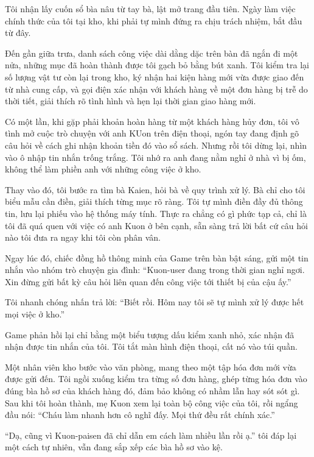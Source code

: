 \documentclass[../main.tex]{subfiles}
\begin{document}
Tôi nhận lấy cuốn sổ bìa nâu từ tay bà, lật mở trang đầu tiên. Ngày làm việc chính thức của tôi tại kho, khi phải tự mình đứng ra chịu trách nhiệm, bắt đầu từ đây.

\ct

Đến gần giữa trưa, danh sách công việc dài dằng dặc trên bàn đã ngắn đi một nửa, những mục đã hoàn thành được tôi gạch bỏ bằng bút xanh. Tôi kiểm tra lại số lượng vật tư còn lại trong kho, ký nhận hai kiện hàng mới vừa được giao đến từ nhà cung cấp, và gọi điện xác nhận với khách hàng về một đơn hàng bị trễ do thời tiết, giải thích rõ tình hình và hẹn lại thời gian giao hàng mới.

Có một lần, khi gặp phải khoản hoàn hàng từ một khách hàng hủy đơn, tôi vô tình mở cuộc trò chuyện với anh KUon trên điện thoại, ngón tay đang định gõ câu hỏi về cách ghi nhận khoản tiền đó vào sổ sách. Nhưng rồi tôi dừng lại, nhìn vào ô nhập tin nhắn trống trắng. Tôi nhớ ra anh đang nằm nghỉ ở nhà vì bị ốm, không thể làm phiền anh với những công việc ở kho. 

Thay vào đó, tôi bước ra tìm bà Kaien, hỏi bà về quy trình xử lý. Bà chỉ cho tôi biểu mẫu cần điền, giải thích từng mục rõ ràng. Tôi tự mình điền đầy đủ thông tin, lưu lại phiếu vào hệ thống máy tính. Thực ra chẳng có gì phức tạp cả, chỉ là tôi đã quá quen với việc có anh Kuon ở bên cạnh, sẵn sàng trả lời bất cứ câu hỏi nào tôi đưa ra ngay khi tôi còn phân vân.

Ngay lúc đó, chiếc đồng hồ thông minh của Game trên bàn bật sáng, gửi một tin nhắn vào nhóm trò chuyện gia đình: ``Kuon-user đang trong thời gian nghỉ ngơi. Xin đừng gửi bất kỳ câu hỏi liên quan đến công việc tới thiết bị của cậu ấy.''

Tôi nhanh chóng nhấn trả lời: ``Biết rồi. Hôm nay tôi sẽ tự mình xử lý được hết mọi việc ở kho.''

Game phản hồi lại chỉ bằng một biểu tượng dấu kiểm xanh nhỏ, xác nhận đã nhận được tin nhắn của tôi. Tôi tắt màn hình điện thoại, cất nó vào túi quần.

Một nhân viên kho bước vào văn phòng, mang theo một tập hóa đơn mới vừa được gửi đến. Tôi ngồi xuống kiểm tra từng số đơn hàng, ghép từng hóa đơn vào đúng bìa hồ sơ của khách hàng đó, đảm bảo không có nhầm lẫn hay sót sót gì. Sau khi tôi hoàn thành, mẹ Kuon xem lại toàn bộ công việc của tôi, rồi ngẩng đầu nói: ``Cháu làm nhanh hơn cô nghĩ đấy. Mọi thứ đều rất chính xác.''

``Dạ, cũng vì Kuon-paisen đã chỉ dẫn em cách làm nhiều lần rồi ạ.'' tôi đáp lại một cách tự nhiên, vẫn đang sắp xếp các bìa hồ sơ vào kệ.
\end{document}
